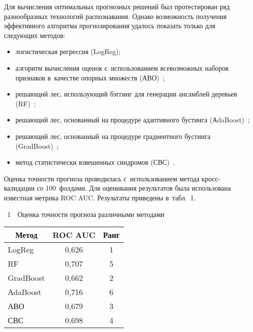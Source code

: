 \begin{multicols}{2}
      Для вычисления оптимальных прогнозных решений был 
протестирован ряд разнообразных технологий распознавания. Однако 
возможность получе\-ния эффективного алгоритма прогнозирования удалось 
показать только для следующих методов:
      \begin{itemize}
      \item логистическая регрессия (LogReg);
      \item алгоритм вычисления оценок с~использованием всевозможных 
наборов признаков в~качестве опорных множеств (АВО)~\cite{3-sen, 5-sen};
      \item решающий лес, использующий бэггинг для генерации ансамблей 
деревьев (RF)~\cite{4-sen};
      \item решающий лес, основанный на процедуре адап\-тив\-но\-го бустинга 
(АdaBoost)~\cite{4-sen, 7-sen};
      \item решающий лес, основанный на процедуре градиентного 
бустинга (GradBoost)~\cite{4-sen, 8-sen};
      \item метод статистически взвешенных синдромов  
(СВС)~\cite{3-sen, 6-sen}.
      \end{itemize}
      
      Оценка точности прогноза проводилась с~использованием метода 
кросс-валидации со 100~фолдами. Для оценивания результатов была 
использована известная метрика ROC AUC. Результаты приведены в~табл.~1.

  
      
{ %
\begin{center}

\parbox{50mm}{{{\tablename~1}\ \ \small{Оценка точности прогноза различными методами}}

}

\vspace*{6pt}

\small 
\begin{tabular}{|l|c|c|}
\hline
\multicolumn{1}{|c|}{Метод}& ROC AUC & Ранг\\
\hline
LogReg& 0,626& 1\\
RF& 0,707& 5\\
GradBoost& 0,662& 2\\
АdaBoost& 0,716& 6\\
АВО& 0,679& 3\\
СВС& 0,698& 4\\
\hline
\end{tabular}
\end{center}
}
      

\end{multicols}
